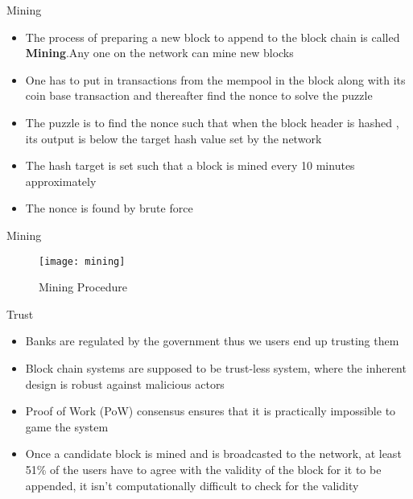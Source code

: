 \documentclass{beamer}
\begin{document}
\begin{frame}{Mining}
\begin{itemize}
    \item The process of preparing a new block to append to the block chain is called \textbf{Mining}.Any one on the network can mine new blocks
    \item One has to put in transactions from the mempool in the block along with its coin base transaction and thereafter find the nonce to solve the puzzle
    \item The puzzle is to find the nonce such that when the block header is hashed , its output is below the target hash value set by the network
    \item The hash target is set such that a block is mined every 10 minutes approximately
    \item The nonce is found by brute force
\end{itemize}
 
\end{frame}
\begin{frame}{Mining}
 \begin{figure}[H]\centering 
\texttt{[image: mining]}
\caption{Mining Procedure}
\end{figure}   
\end{frame}
\begin{frame}{Trust}
\begin{itemize}
    \item Banks are regulated by the government thus we users end up trusting them
    \item Block chain systems are supposed to be trust-less system, where the inherent design is robust against malicious actors
    \item Proof of Work (PoW) consensus ensures that it is practically impossible to game the system
    \item Once a candidate block is mined and is broadcasted to the network, at least 51\% of the users have to agree with the validity of the block for it to be appended, it isn't computationally difficult to check for the validity
\end{itemize}

    
\end{frame}
\end{document}
